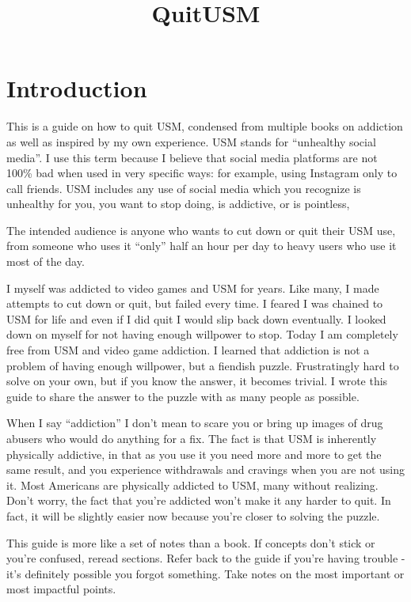 \documentclass[
]{book}
\title{QuitUSM}
\author{}
\date{\vspace{-2.5em}}
\begin{document}
\maketitle

{
\setcounter{tocdepth}{1}
\tableofcontents
}
\chapter{Introduction}\label{introduction}

This is a guide on how to quit USM, condensed from multiple books on addiction as well as inspired by my own experience. USM stands for ``unhealthy social media''. I use this term because I believe that social media platforms are not 100\% bad when used in very specific ways: for example, using Instagram only to call friends. USM includes any use of social media which you recognize is unhealthy for you, you want to stop doing, is addictive, or is pointless,

The intended audience is anyone who wants to cut down or quit their USM use, from someone who uses it ``only'' half an hour per day to heavy users who use it most of the day.

I myself was addicted to video games and USM for years. Like many, I made attempts to cut down or quit, but failed every time. I feared I was chained to USM for life and even if I did quit I would slip back down eventually. I looked down on myself for not having enough willpower to stop. Today I am completely free from USM and video game addiction. I learned that addiction is not a problem of having enough willpower, but a fiendish puzzle. Frustratingly hard to solve on your own, but if you know the answer, it becomes trivial. I wrote this guide to share the answer to the puzzle with as many people as possible.

When I say ``addiction'' I don't mean to scare you or bring up images of drug abusers who would do anything for a fix. The fact is that USM is inherently physically addictive, in that as you use it you need more and more to get the same result, and you experience withdrawals and cravings when you are not using it. Most Americans are physically addicted to USM, many without realizing. Don't worry, the fact that you're addicted won't make it any harder to quit. In fact, it will be slightly easier now because you're closer to solving the puzzle.

This guide is more like a set of notes than a book. If concepts don't stick or you're confused, reread sections. Refer back to the guide if you're having trouble - it's definitely possible you forgot something. Take notes on the most important or most impactful points.
\end{document}
